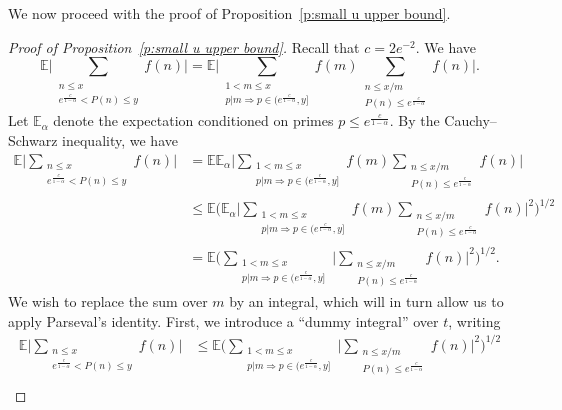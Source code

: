 \documentclass[12pt,a4paper,reqno]{amsart}
\numberwithin{equation}{section}
\def\E{\mathbb E}
\def\leq {\leqslant}
\theoremstyle{remark}
\theoremstyle{definition}
\numberwithin{equation}{section}
\theoremstyle{remark}
\def\E{\mathbb E}
\begin{document}
We now proceed with the proof of Proposition~\ref{p:small u upper bound}.
\begin{proof}[Proof of Proposition~\ref{p:small u upper bound}]
Recall that $c = 2e^{-2}$. We have
\[
\E \biggl| \sum_{\substack{n \leq x \\ e^{\frac{c}{1-\alpha}} < P(n) \leq y}} f(n) \biggr| = \E \biggl| \sum_{\substack{1 < m \leq x \\ p | m \Rightarrow p \in (e^{\frac{c}{1-\alpha}}, y]}} f(m) \sum_{\substack{n \leq x/m \\ P(n) \leq e^{\frac{c}{1 - \alpha}}}} f(n) \biggr|.
\]
Let ${\E}_{\alpha}$ denote the expectation conditioned on primes $p \leq e^{\frac{c}{1 - \alpha}}$. By the Cauchy--Schwarz inequality, we have
\begin{align*}
\E \biggl| \sum_{\substack{n \leq x \\ e^{\frac{c}{1-\alpha}} < P(n) \leq y}} f(n) \biggr| &= \E \E_{\alpha} \biggl| \sum_{\substack{1 < m \leq x \\ p | m \Rightarrow p \in (e^{\frac{c}{1-\alpha}}, y]}} f(m) \sum_{\substack{n \leq x/m \\ P(n) \leq e^{\frac{c}{1 - \alpha}}}} f(n) \biggr| \\
& \leq \E \biggl( \E_{\alpha} \biggl| \sum_{\substack{1 < m \leq x \\ p | m \Rightarrow p \in (e^{\frac{c}{1-\alpha}}, y]}} f(m) \sum_{\substack{n \leq x/m \\ P(n) \leq e^{\frac{c}{1 - \alpha}}}} f(n) \biggr|^2 \biggr)^{1/2} \\ 
& = \E \biggl( \sum_{\substack{1 < m \leq x \\ p | m \Rightarrow p \in (e^{\frac{c}{1-\alpha}}, y]}} \biggl| \sum_{\substack{n \leq x/m \\ P(n) \leq e^{\frac{c}{1 - \alpha}}}} f(n) \biggr|^2 \biggr)^{1/2} .
\end{align*}
We wish to replace the sum over $m$ by an integral, which will in turn allow us to apply Parseval's identity. First, we introduce a ``dummy integral'' over $t$, writing
\begin{align*}
\E \biggl| \sum_{\substack{n \leq x \\ e^{\frac{c}{1-\alpha}} < P(n) \leq y}} f(n) \biggr| & \leq \E \biggl( \sum_{\substack{1 < m \leq x \\ p | m \Rightarrow p \in (e^{\frac{c}{1-\alpha}}, y]}} \biggl| \sum_{\substack{n \leq x/m \\ P(n) \leq e^{\frac{c}{1 - \alpha}}}} f(n) \biggr|^2 \biggr)^{1/2} \\

\end{align*}
\end{proof}
\end{document}
